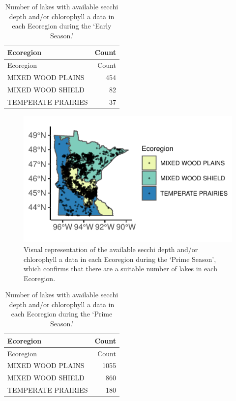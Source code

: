 \documentclass[12pt,]{article}
\begin{document}
\begin{longtable}[]{@{}lr@{}}
\caption{Number of lakes with available secchi depth and/or chlorophyll
a data in each Ecoregion during the `Early Season.'}\tabularnewline
\toprule
Ecoregion & Count\tabularnewline
\midrule
\endfirsthead
\toprule
Ecoregion & Count\tabularnewline
\midrule
\endhead
MIXED WOOD PLAINS & 454\tabularnewline
MIXED WOOD SHIELD & 82\tabularnewline
TEMPERATE PRAIRIES & 37\tabularnewline
\bottomrule
\end{longtable}

\begin{figure}
\centering
\includegraphics{Bollt_Greif_Raby_Roth_Project_Final_files/figure-latex/unnamed-chunk-12-1.pdf}
\caption{Visual representation of the available secchi depth and/or
chlorophyll a data in each Ecoregion during the `Prime Season', which
confirms that there are a suitable number of lakes in each Ecoregion.}
\end{figure}

\begin{longtable}[]{@{}lr@{}}
\caption{Number of lakes with available secchi depth and/or chlorophyll
a data in each Ecoregion during the `Prime Season.'}\tabularnewline
\toprule
Ecoregion & Count\tabularnewline
\midrule
\endfirsthead
\toprule
Ecoregion & Count\tabularnewline
\midrule
\endhead
MIXED WOOD PLAINS & 1055\tabularnewline
MIXED WOOD SHIELD & 860\tabularnewline
TEMPERATE PRAIRIES & 180\tabularnewline
\bottomrule
\end{longtable}
\end{document}
